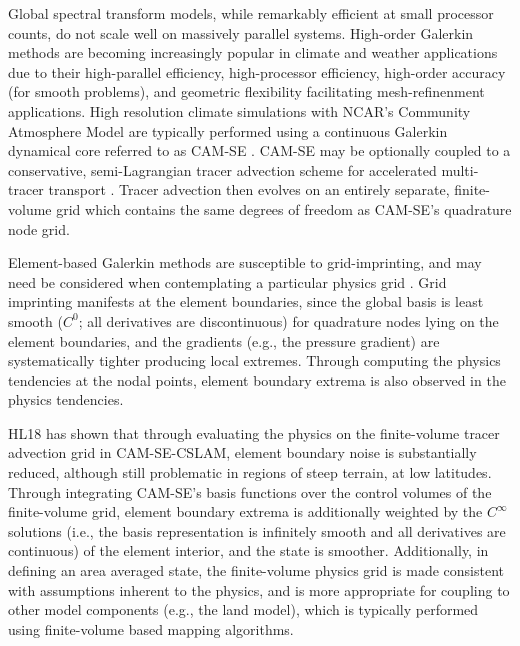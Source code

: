 \documentclass{agujournal}
\begin{document}
Global spectral transform models, while remarkably efficient at small processor counts, do not scale well on massively parallel systems. High-order Galerkin methods are becoming increasingly popular in climate and weather applications due to their high-parallel efficiency, high-processor efficiency, high-order accuracy (for smooth problems), and geometric flexibility facilitating mesh-refinenment applications. High resolution climate simulations with NCAR's Community Atmosphere Model \citep[CAM;][]{CAM5} are typically performed using a continuous Galerkin dynamical core referred to as CAM-SE \citep[CAM Spectral Elements;][]{TES2008JPCS,DetAl2012IJHPCA,LetAl2018JAMES}. CAM-SE may be optionally coupled to a conservative, semi-Lagrangian tracer advection scheme for accelerated multi-tracer transport \citep[CAM-SE-CSLAM;][]{LTOUNGK2017MWR}. Tracer advection then evolves on an entirely separate, finite-volume grid which contains the same degrees of freedom as CAM-SE's quadrature node grid.

Element-based Galerkin methods are susceptible to grid-imprinting, and may need be considered when contemplating a particular physics grid \citep[][hereafter referred to as HL18]{HL2018MWR}. Grid imprinting manifests at the element boundaries, since the global basis is least smooth ($C^{0}$; all derivatives are discontinuous) for quadrature nodes lying on the element boundaries, and the gradients (e.g., the pressure gradient) are systematically tighter producing local extremes. Through computing the physics tendencies at the nodal points, element boundary extrema is also observed in the physics tendencies. 

HL18 has shown that through evaluating the physics on the finite-volume tracer advection grid in CAM-SE-CSLAM, element boundary noise is substantially reduced, although still problematic in regions of steep terrain, at low latitudes. Through integrating CAM-SE's basis functions over the control volumes of the finite-volume grid, element boundary extrema is additionally weighted by the $C^{\infty}$ solutions (i.e., the basis representation is infinitely smooth and all derivatives are continuous) of the element interior, and the state is smoother. Additionally, in defining an area averaged state, the finite-volume physics grid is made consistent with assumptions inherent to the physics, and is more appropriate for coupling to other model components (e.g., the land model), which is typically performed using finite-volume based mapping algorithms.
\end{document}
